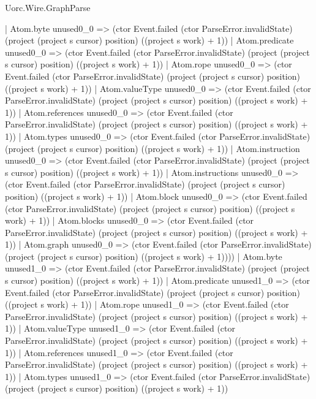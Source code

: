 \begin{lexlean}{Uorc.Wire.GraphParse}
\begin{semanticmodule}
{                  | Atom.byte unused0_0 => (ctor Event.failed (ctor ParseError.invalidState) (project (project s cursor) position) ((project s work) + 1))
                  | Atom.predicate unused0_0 => (ctor Event.failed (ctor ParseError.invalidState) (project (project s cursor) position) ((project s work) + 1))
                  | Atom.rope unused0_0 => (ctor Event.failed (ctor ParseError.invalidState) (project (project s cursor) position) ((project s work) + 1))
                  | Atom.valueType unused0_0 => (ctor Event.failed (ctor ParseError.invalidState) (project (project s cursor) position) ((project s work) + 1))
                  | Atom.references unused0_0 => (ctor Event.failed (ctor ParseError.invalidState) (project (project s cursor) position) ((project s work) + 1))
                  | Atom.types unused0_0 => (ctor Event.failed (ctor ParseError.invalidState) (project (project s cursor) position) ((project s work) + 1))
                  | Atom.instruction unused0_0 => (ctor Event.failed (ctor ParseError.invalidState) (project (project s cursor) position) ((project s work) + 1))
                  | Atom.instructions unused0_0 => (ctor Event.failed (ctor ParseError.invalidState) (project (project s cursor) position) ((project s work) + 1))
                  | Atom.block unused0_0 => (ctor Event.failed (ctor ParseError.invalidState) (project (project s cursor) position) ((project s work) + 1))
                  | Atom.blocks unused0_0 => (ctor Event.failed (ctor ParseError.invalidState) (project (project s cursor) position) ((project s work) + 1))
                  | Atom.graph unused0_0 => (ctor Event.failed (ctor ParseError.invalidState) (project (project s cursor) position) ((project s work) + 1))))
              | Atom.byte unused1_0 => (ctor Event.failed (ctor ParseError.invalidState) (project (project s cursor) position) ((project s work) + 1))
              | Atom.predicate unused1_0 => (ctor Event.failed (ctor ParseError.invalidState) (project (project s cursor) position) ((project s work) + 1))
              | Atom.rope unused1_0 => (ctor Event.failed (ctor ParseError.invalidState) (project (project s cursor) position) ((project s work) + 1))
              | Atom.valueType unused1_0 => (ctor Event.failed (ctor ParseError.invalidState) (project (project s cursor) position) ((project s work) + 1))
              | Atom.references unused1_0 => (ctor Event.failed (ctor ParseError.invalidState) (project (project s cursor) position) ((project s work) + 1))
              | Atom.types unused1_0 => (ctor Event.failed (ctor ParseError.invalidState) (project (project s cursor) position) ((project s work) + 1))
}
\end{semanticmodule}
\end{lexlean}

